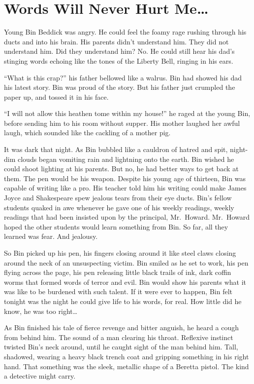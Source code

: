 \chapter{Words Will Never Hurt Me{\ldots}}





Young Bin Beddick was angry. He could feel the foamy rage rushing
through his ducts and into his brain. His parents didn't
understand him. They did not understand him. Did they understand
him? No. He could still hear his dad's stinging words echoing
like the tones of the Liberty Bell, ringing in his ears.

``What is this crap?'' his father bellowed like a walrus.
Bin had showed his dad his latest story. Bin was proud of the
story. But his father just crumpled the paper up, and tossed it in
his face.

``I will not allow this heathen tome within my house!''
he raged at the young Bin, before sending him to his room without
supper. His mother laughed her awful laugh, which sounded like the
cackling of a mother pig.

It was dark that night. As Bin bubbled like a cauldron of hatred
and spit, night-dim clouds began vomiting rain and lightning onto
the earth. Bin wished he could shoot lighting at his parents. But
no, he had better ways to get back at them. The pen would be his
weapon. Despite his young age of thirteen, Bin was capable of
writing like a pro. His teacher told him his writing could make
James Joyce and Shakespeare spew jealous tears from their eye
ducts. Bin's fellow students quaked in awe whenever he gave
one of his weekly readings, weekly readings that had been insisted
upon by the principal, Mr.\ Howard. Mr.\ Howard hoped the other
students would learn something from Bin. So far, all they learned
was fear. And jealousy.

So Bin picked up his pen, his fingers closing around it like steel
claws closing around the neck of an unsuspecting victim. Bin smiled
as he set to work, his pen flying across the page, his pen
releasing little black trails of ink, dark coffin worms that formed
words of terror and evil. Bin would show his parents what it was
like to be burdened with such talent. If it were ever to happen,
Bin felt tonight was the night he could give life to his words, for
real. How little did he know, he was too right{\ldots}

As Bin finished his tale of fierce revenge and bitter anguish, he
heard a cough from behind him. The sound of a man clearing his
throat. Reflexive instinct twisted Bin's neck around, until
he caught sight of the man behind him. Tall, shadowed, wearing a
heavy black trench coat and gripping something in his right hand.
That something was the sleek, metallic shape of a Beretta pistol.
The kind a detective might carry.

